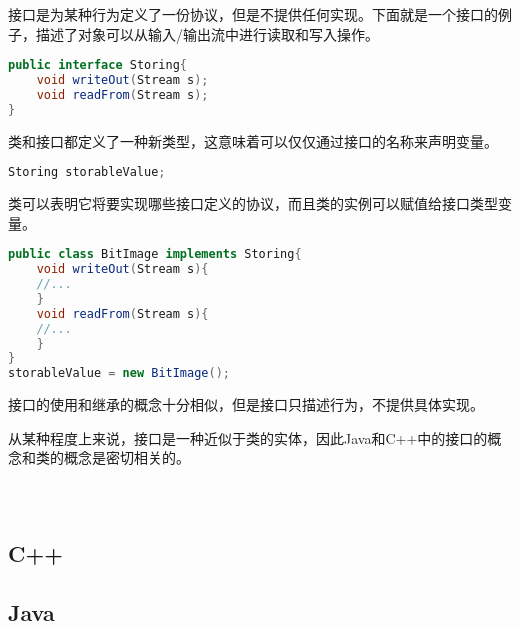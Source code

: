接口是为某种行为定义了一份协议，但是不提供任何实现。下面就是一个接口的例子，描述了对象可以从输入/输出流中进行读取和写入操作。



\begin{lstlisting}[language=Java]
public interface Storing{
	void writeOut(Stream s);
	void readFrom(Stream s);
}
\end{lstlisting}

类和接口都定义了一种新类型，这意味着可以仅仅通过接口的名称来声明变量。


\begin{lstlisting}[language=Java]
Storing storableValue;
\end{lstlisting}

类可以表明它将要实现哪些接口定义的协议，而且类的实例可以赋值给接口类型变量。


\begin{lstlisting}[language=Java]
public class BitImage implements Storing{
	void writeOut(Stream s){
	//...
	}
	void readFrom(Stream s){
	//...
	}
}
storableValue = new BitImage();
\end{lstlisting}

接口的使用和继承的概念十分相似，但是接口只描述行为，不提供具体实现。

从某种程度上来说，接口是一种近似于类的实体，因此Java和C++中的接口的概念和类的概念是密切相关的。



\begin{lstlisting}[language=Java]

\end{lstlisting}





\begin{lstlisting}[language=Java]

\end{lstlisting}





\begin{lstlisting}[language=Java]

\end{lstlisting}




\subsection{C++}





\subsection{Java}





